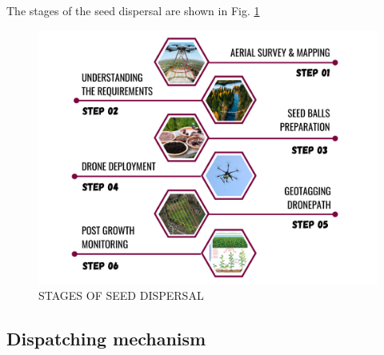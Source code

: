 \documentclass[conference]{IEEEtran}
\begin{document}
The stages of the seed dispersal are shown in Fig. \ref{sd}
\begin{figure}[htp]
    \centering
    \includegraphics[scale =0.05]{Narcondam_flowchart.png}
    \caption{STAGES OF SEED DISPERSAL}
    \label{sd}
\end{figure}


\subsection{Dispatching mechanism}
\end{document}
